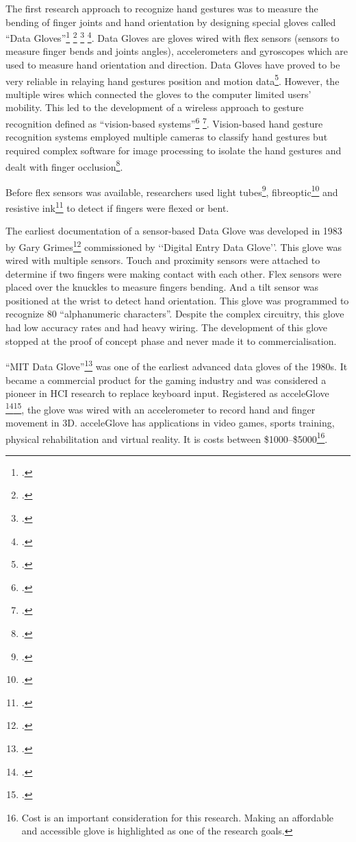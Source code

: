 The first research approach to recognize hand gestures was to measure the bending of finger joints and hand orientation by designing special gloves called ``Data Gloves''\footcite{Rautaray2015} \footcite{Pavlovic1997} \footcite{Takahashi1992} \footcite{Liang1998}. Data Gloves are gloves wired with flex sensors (sensors to measure finger bends and joints angles), accelerometers and gyroscopes which are used to measure hand orientation and direction. Data Gloves have proved to be very reliable in relaying hand gestures position and motion data\footcite{Mitra2007}. However, the multiple wires which connected the gloves to the computer limited users' mobility. This led to the development of a wireless approach to gesture recognition defined as ``vision-based systems''\footcite{Rautaray2015} \footcite{Pavlovic1997}. Vision-based hand gesture recognition systems employed multiple cameras to classify hand gestures but required complex software for image processing to isolate the hand gestures and dealt with finger occlusion\footcite{Shen2012}. 

Before flex sensors was available, researchers used light tubes\footcite{DipietroL.SabatiniA.M.Dario2008}, fibreoptic\footcite{DipietroL.SabatiniA.M.Dario2008} and resistive ink\footcite{LaViola1999} to detect if fingers were flexed or bent. 

The earliest documentation of a sensor-based Data Glove was developed in 1983 by Gary Grimes\footcite{DipietroL.SabatiniA.M.Dario2008} commissioned by ‘‘Digital Entry Data Glove’'. This glove was wired with multiple sensors. Touch and proximity sensors were attached to determine if two fingers were making contact with each other. Flex sensors were placed over the knuckles to measure fingers bending. And a tilt sensor was positioned at the wrist to detect hand orientation. This glove was programmed to recognize 80 ``alphanumeric characters''. Despite the complex circuitry, this glove had low accuracy rates and had heavy wiring. The development of this glove stopped at the proof of concept phase and never made it to commercialisation.

``MIT Data Glove''\footcite{Premaratne2010} was one of the earliest advanced data gloves of the 1980s. It became a commercial product for the gaming industry and was considered a pioneer in HCI research to replace keyboard input. Registered as acceleGlove \footcite{AcceleGlove2016}\footcite{AcceleGlove2017}, the glove was wired with an accelerometer to record hand and finger movement in 3D. acceleGlove has applications in video games, sports training, physical rehabilitation and virtual reality. It is costs between \$1000–\$5000\footnote{Cost is an important consideration for this research. Making an affordable and accessible glove is highlighted as one of the research goals.}.

